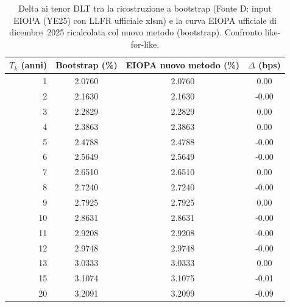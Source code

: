 \begin{table}[H]\centering\small
\caption{Delta ai tenor DLT tra la ricostruzione a bootstrap (Fonte D: input EIOPA (YE25) con LLFR ufficiale xlsm) e la curva EIOPA ufficiale di dicembre~2025 ricalcolata col nuovo metodo (bootstrap). Confronto like-for-like.}
\label{tab:delta-new-llfr}\renewcommand{\arraystretch}{1.15}
\begin{tabular}{rccc}
\toprule
$T_k$ (anni) & Bootstrap (\%) & EIOPA nuovo metodo (\%) & $\Delta$ (bps)\\
\midrule
\rowcolor{rowtint}1 & 2.0760 & 2.0760 & 0.00\\
2 & 2.1630 & 2.1630 & -0.00\\
\rowcolor{rowtint}3 & 2.2829 & 2.2829 & 0.00\\
4 & 2.3863 & 2.3863 & 0.00\\
\rowcolor{rowtint}5 & 2.4788 & 2.4788 & -0.00\\
6 & 2.5649 & 2.5649 & -0.00\\
\rowcolor{rowtint}7 & 2.6510 & 2.6510 & 0.00\\
8 & 2.7240 & 2.7240 & -0.00\\
\rowcolor{rowtint}9 & 2.7925 & 2.7925 & 0.00\\
10 & 2.8631 & 2.8631 & -0.00\\
\rowcolor{rowtint}11 & 2.9208 & 2.9208 & -0.00\\
12 & 2.9748 & 2.9748 & -0.00\\
\rowcolor{rowtint}13 & 3.0333 & 3.0333 & 0.00\\
15 & 3.1074 & 3.1075 & -0.01\\
\rowcolor{rowtint}20 & 3.2091 & 3.2099 & -0.09\\
\bottomrule
\end{tabular}
\end{table}
